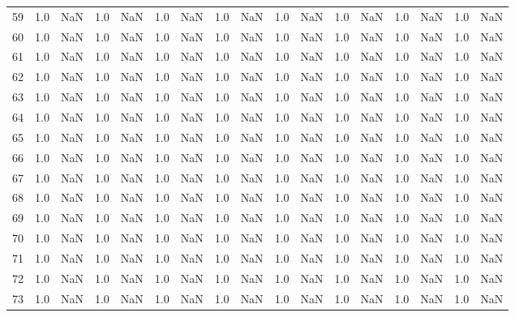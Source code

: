 \begin{tabular}{lrrrrrrrrrrrrrrrr}
     59 &  1.0 & NaN &   1.0 &   NaN &   1.0 &   NaN &   1.0 &   NaN &   1.0 &   NaN &   1.0 &   NaN &   1.0 &   NaN &   1.0 &   NaN \\
     60 &  1.0 & NaN &   1.0 &   NaN &   1.0 &   NaN &   1.0 &   NaN &   1.0 &   NaN &   1.0 &   NaN &   1.0 &   NaN &   1.0 &   NaN \\
     61 &  1.0 & NaN &   1.0 &   NaN &   1.0 &   NaN &   1.0 &   NaN &   1.0 &   NaN &   1.0 &   NaN &   1.0 &   NaN &   1.0 &   NaN \\
     62 &  1.0 & NaN &   1.0 &   NaN &   1.0 &   NaN &   1.0 &   NaN &   1.0 &   NaN &   1.0 &   NaN &   1.0 &   NaN &   1.0 &   NaN \\
     63 &  1.0 & NaN &   1.0 &   NaN &   1.0 &   NaN &   1.0 &   NaN &   1.0 &   NaN &   1.0 &   NaN &   1.0 &   NaN &   1.0 &   NaN \\
     64 &  1.0 & NaN &   1.0 &   NaN &   1.0 &   NaN &   1.0 &   NaN &   1.0 &   NaN &   1.0 &   NaN &   1.0 &   NaN &   1.0 &   NaN \\
     65 &  1.0 & NaN &   1.0 &   NaN &   1.0 &   NaN &   1.0 &   NaN &   1.0 &   NaN &   1.0 &   NaN &   1.0 &   NaN &   1.0 &   NaN \\
     66 &  1.0 & NaN &   1.0 &   NaN &   1.0 &   NaN &   1.0 &   NaN &   1.0 &   NaN &   1.0 &   NaN &   1.0 &   NaN &   1.0 &   NaN \\
     67 &  1.0 & NaN &   1.0 &   NaN &   1.0 &   NaN &   1.0 &   NaN &   1.0 &   NaN &   1.0 &   NaN &   1.0 &   NaN &   1.0 &   NaN \\
     68 &  1.0 & NaN &   1.0 &   NaN &   1.0 &   NaN &   1.0 &   NaN &   1.0 &   NaN &   1.0 &   NaN &   1.0 &   NaN &   1.0 &   NaN \\
     69 &  1.0 & NaN &   1.0 &   NaN &   1.0 &   NaN &   1.0 &   NaN &   1.0 &   NaN &   1.0 &   NaN &   1.0 &   NaN &   1.0 &   NaN \\
     70 &  1.0 & NaN &   1.0 &   NaN &   1.0 &   NaN &   1.0 &   NaN &   1.0 &   NaN &   1.0 &   NaN &   1.0 &   NaN &   1.0 &   NaN \\
     71 &  1.0 & NaN &   1.0 &   NaN &   1.0 &   NaN &   1.0 &   NaN &   1.0 &   NaN &   1.0 &   NaN &   1.0 &   NaN &   1.0 &   NaN \\
     72 &  1.0 & NaN &   1.0 &   NaN &   1.0 &   NaN &   1.0 &   NaN &   1.0 &   NaN &   1.0 &   NaN &   1.0 &   NaN &   1.0 &   NaN \\
     73 &  1.0 & NaN &   1.0 &   NaN &   1.0 &   NaN &   1.0 &   NaN &   1.0 &   NaN &   1.0 &   NaN &   1.0 &   NaN &   1.0 &   NaN \\

\end{tabular}
